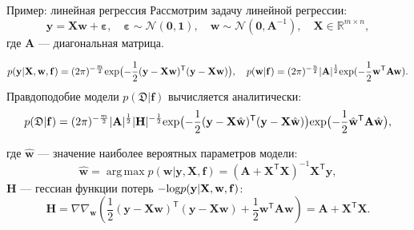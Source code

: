\documentclass[10pt,pdf,utf8,russian,aspectratio=169]{beamer}
\DeclareMathOperator*{\argmax}{arg\,max}
\begin{document}
\begin{frame}{Пример: линейная регрессия}
Рассмотрим задачу линейной регрессии:
\[
	\mathbf{y} =\mathbf{X} \mathbf{w} + \boldsymbol{\varepsilon},\quad \boldsymbol{\varepsilon}  \sim \mathcal{N}(\mathbf{0},\mathbf{1}),\quad \mathbf{w} \sim  \mathcal{N}(\mathbf{0},\mathbf{A}^{-1}),\quad  \mathbf{X} \in \mathbb{R}^{m \times n},
\]
где $\mathbf{A}$ --- диагональная матрица. 

\[
	p(\mathbf{y}|  \mathbf{X}, \mathbf{w}, \mathbf{f}) = (2\pi) ^{-\frac{m}{2}} \textnormal{exp} \bigl(-\frac{1}{2}(\mathbf{y} -\mathbf{X} \mathbf{w})^\mathsf{T}(\mathbf{y} - \mathbf{X}\mathbf{w})\bigr),
\quad
p(\mathbf{w}|\mathbf{f}) =  (2\pi) ^{-\frac{n}{2}} |\mathbf{A}|^{\frac{1}{2}} \textnormal{exp} (-\frac{1}{2}\mathbf{w}^\mathsf{T}\mathbf{A}\mathbf{w}).
\]
Правдоподобие модели $p(\mathfrak{D}|\mathbf{f})$ вычисляется аналитически:
\[
	p(\mathfrak{D}|\mathbf{f})  =  (2\pi) ^{-\frac{m}{2}} |\mathbf{A}|^{\frac{1}{2}} |\mathbf{H}|^{-\frac{1}{2}}  \textnormal{exp}\bigl(-\frac{1}{2}(\mathbf{y} -\mathbf{X} \hat{\mathbf{w}})^\mathsf{T}(\mathbf{y} - \mathbf{X}\hat{\mathbf{w}})\bigr)\textnormal{exp} \bigl(-\frac{1}{2}\hat{\mathbf{w}}^\mathsf{T}\mathbf{A}\hat{\mathbf{w}}\bigr),
\]

где $\hat{\mathbf{w}}$ --- значение наиболее вероятных параметров модели:
\[
	\hat{\mathbf{w}} = \argmax p(\mathbf{w}|\mathbf{y}, \mathbf{X}, \mathbf{f}) = (\mathbf{A} + \mathbf{X}^\mathsf{T}\mathbf{X})^{-1}\mathbf{X}^\mathsf{T}\mathbf{y},
\]
$\mathbf{H}$ --- гессиан функции потерь $- \textnormal{log} p(\mathbf{y}|  \mathbf{X}, \mathbf{w}, \mathbf{f})$:
\[
	\mathbf{H}	= \nabla \nabla_\mathbf{w} \left(\frac{1}{2} (\mathbf{y} -\mathbf{X} {\mathbf{w}})^\mathsf{T}(\mathbf{y} - \mathbf{X}{\mathbf{w}}) + \frac{1}{2}\mathbf{w}^\mathsf{T}\mathbf{A}\mathbf{w} \right) = \mathbf{A} + \mathbf{X}^\mathsf{T}\mathbf{X}.
\]


\end{frame}
\end{document}
